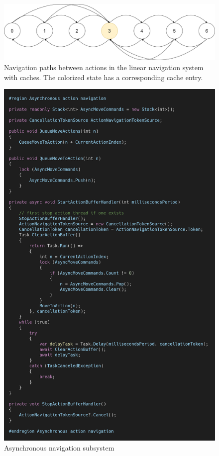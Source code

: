 \begin{figure}
\caption{Navigation paths between actions in the linear navigation system with caches. The colorized state has a corresponding cache entry.}
\label{fig:navsystem.cache.overview}
\centering
\includegraphics[width=\textwidth]{figures/navigationsystem-diagram/navigationsystem-cache-overview-2.png}
\end{figure}

\begin{figure}
\caption{Asynchronous navigation subsystem}
\label{fig:async.navigation}
\centering
\includegraphics[width=\textwidth]{figures/code/nav-arch/async-navigation.png}
\end{figure}


